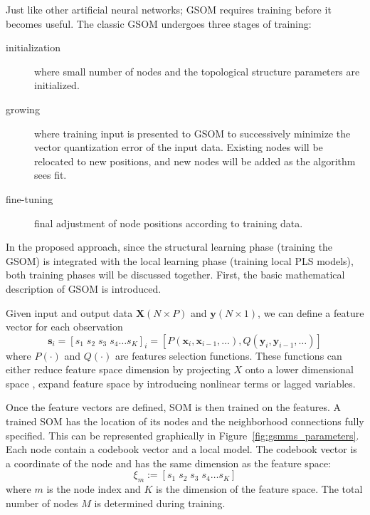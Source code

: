 \documentclass[review,3p]{elsarticle}
\renewcommand\[{\begin{equation}}
\renewcommand\]{\end{equation}}
\begin{document}
Just like other artificial neural networks; GSOM requires training before it
becomes useful. The classic GSOM undergoes three stages of training:
\begin{description}
  \item[initialization] where small number of nodes and the topological
      structure parameters are initialized.
  \item[growing] where training input is presented to GSOM to successively
      minimize the vector quantization error of the input data. Existing
      nodes will be relocated to new positions, and new nodes will be added
      as the algorithm sees fit.
  \item[fine-tuning] final adjustment of node positions according to
      training data.
\end{description}

In the proposed approach, since the structural learning phase (training the
GSOM) is integrated with the local learning phase (training local PLS models), both training phases will be discussed together. First, the basic mathematical description of GSOM is introduced.

Given input and output data $\mathbf X (N \times P)$ and ${\mathbf y} (N \times 1)$, we can
define a feature vector for each observation
\[\mathbf{s}_i = [s_1\;s_2\;s_3\;s_4\ldots s_K]_i = [P(\mathbf{x}_i,\mathbf{x}_{i-1},\ldots),
Q(\mathbf{y}_i,\mathbf{y}_{i-1},\ldots)] \] where $P(\cdot)$ and $Q(\cdot)$
are features selection functions. These functions can either reduce feature
space dimension by projecting $X$ onto a lower dimensional space , expand
feature space by introducing nonlinear terms or lagged variables.  

Once the feature vectors are defined, SOM is then trained on the features. A trained SOM has the location of its nodes and the neighborhood connections fully specified. This can be represented graphically in Figure~\ref{fig:gsmms_parameters}. Each node contain a codebook vector and a local model. The codebook vector is a coordinate of the node and has the same dimension as the feature space:
\[
\xi_m := [s_1\;s_2\;s_3\;s_4\ldots s_K]
\]
where $m$ is the node index and $K$ is the dimension of the feature space. The total number of nodes $M$ is determined during training.
\end{document}

